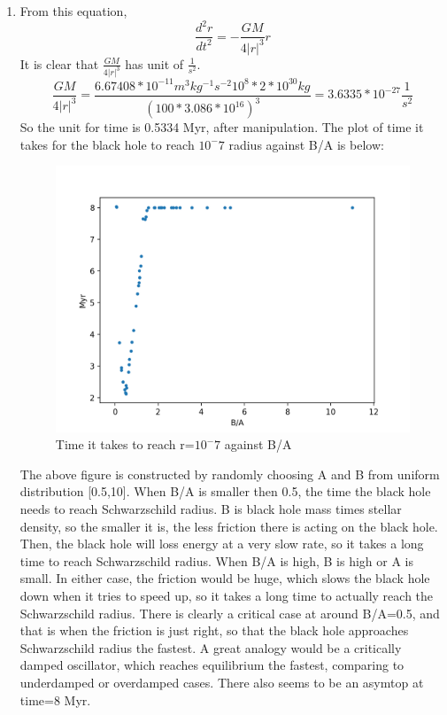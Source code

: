 \documentclass[12pt,letterpaper]{article}
\begin{document}
\begin{enumerate}
    \item
    From this equation,
    \begin{equation}
        \frac{d^2r}{dt^2}=-\frac{GM}{4|r|^3}r
    \end{equation}
    It is clear that $\frac{GM}{4|r|^3}$ has unit of $\frac{1}{s^2}$. 
    \begin{equation}
        \frac{GM}{4|r|^3}=\frac{6.67408*10^{-11} m^3 kg^{-1} s^{-2} 10^{8}*2*10^{30}kg }{(100*3.086*10^{16})^3}=3.6335*10^{-27}\frac{1}{s^2}
    \end{equation}
    So the unit for time is 0.5334 Myr, after manipulation.
    \clearpage
    The plot of time it takes for the black hole to reach $10^-7$ radius against B/A is below:
    \begin{figure}[h]
    \centering
    \includegraphics[width=1.\linewidth]{fig2g}
    \caption{Time it takes to reach r=$10^-7$ against B/A}
    \end{figure}
    
    The above figure is constructed by randomly choosing A and B from uniform distribution [0.5,10]. When B/A is smaller then 0.5, the time the black hole needs to reach Schwarzschild radius. B is black hole mass times stellar density, so the smaller it is, the less friction there is acting on the black hole. Then, the black hole will loss energy at a very slow rate, so it takes a long time to reach Schwarzschild radius. When B/A is high, B is high or A is small. In either case, the friction would be huge, which slows the black hole down when it tries to speed up, so it takes a long time to actually reach the Schwarzschild radius. There is clearly a critical case at around B/A=0.5, and that is when the friction is just right, so that the black hole approaches Schwarzschild radius the fastest. A great analogy would be a critically damped oscillator, which reaches equilibrium the fastest, comparing to underdamped or overdamped cases. There also seems to be an asymtop at time=8 Myr.
    

\end{enumerate}
\end{document}
